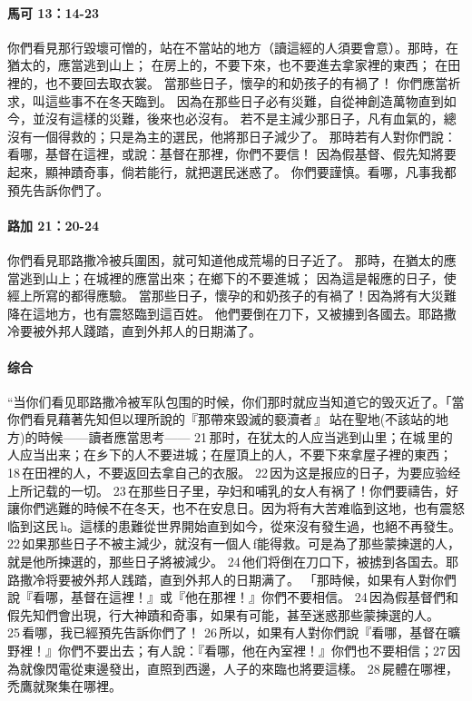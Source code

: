 \paragraph{馬可 13：14-23}
你們看見那行毀壞可憎的，站在不當站的地方（讀這經的人須要會意）。那時，在猶太的，應當逃到山上；
在房上的，不要下來，也不要進去拿家裡的東西；
在田裡的，也不要回去取衣裳。
當那些日子，懷孕的和奶孩子的有禍了！
你們應當祈求，叫這些事不在冬天臨到。
因為在那些日子必有災難，自從神創造萬物直到如今，並沒有這樣的災難，後來也必沒有。
若不是主減少那日子，凡有血氣的，總沒有一個得救的；只是為主的選民，他將那日子減少了。
那時若有人對你們說：看哪，基督在這裡，或說：基督在那裡，你們不要信！
因為假基督、假先知將要起來，顯神蹟奇事，倘若能行，就把選民迷惑了。
你們要謹慎。看哪，凡事我都預先告訴你們了。

\paragraph{路加 21：20-24}
你們看見耶路撒冷被兵圍困，就可知道他成荒場的日子近了。
那時，在猶太的應當逃到山上；在城裡的應當出來；在鄉下的不要進城；
因為這是報應的日子，使經上所寫的都得應驗。
當那些日子，懷孕的和奶孩子的有禍了！因為將有大災難降在這地方，也有震怒臨到這百姓。
他們要倒在刀下，又被擄到各國去。耶路撒冷要被外邦人踐踏，直到外邦人的日期滿了。
\paragraph{综合}
“当你们看见耶路撒冷被军队包围的时候，你们那时就应当知道它的毁灭近了。「當你們看見藉著先知但以理所說的『那帶來毀滅的褻瀆者 』 站在聖地(不該站的地方)的時候——讀者應當思考——  21 那时，在犹太的人应当逃到山里；在城 里的人应当出来；在乡下的人不要进城；在屋頂上的人，不要下來拿屋子裡的東西； 18 在田裡的人，不要返回去拿自己的衣服。 22 因为这是报应的日子，为要应验经上所记载的一切。 23 在那些日子里，孕妇和哺乳的女人有祸了！你們要禱告，好讓你們逃難的時候不在冬天，也不在安息日。因为将有大苦难临到这地，也有震怒临到这民 h。這樣的患難從世界開始直到如今，從來沒有發生過，也絕不再發生。22 如果那些日子不被主減少，就沒有一個人 f能得救。可是為了那些蒙揀選的人，就是他所揀選的，那些日子將被減少。 24 他们将倒在刀口下，被掳到各国去。耶路撒冷将要被外邦人践踏，直到外邦人的日期满了。
「那時候，如果有人對你們說『看哪，基督在這裡！』或『他在那裡！』你們不要相信。 24 因為假基督們和假先知們會出現，行大神蹟和奇事，如果有可能，甚至迷惑那些蒙揀選的人。 25 看哪，我已經預先告訴你們了！ 26 所以，如果有人對你們說『看哪，基督在曠野裡！』你們不要出去；有人說：『看哪，他在內室裡！』你們也不要相信；27 因為就像閃電從東邊發出，直照到西邊，人子的來臨也將要這樣。 28 屍體在哪裡，禿鷹就聚集在哪裡。


